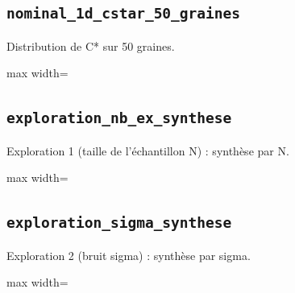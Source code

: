 \documentclass[a4paper,10pt]{article}
\newcommand{\tablesroot}{results/tables}
\begin{document}
\noindent\begin{minipage}{\linewidth}
\subsection*{\texttt{nominal\_1d\_cstar\_50\_graines}}
Distribution de C* sur 50 graines.
\par
\begingroup\centering\footnotesize
\begin{adjustbox}{max width=\linewidth}

\end{adjustbox}\par
\endgroup
\end{minipage}
\par\medskip

\noindent\begin{minipage}{\linewidth}
\subsection*{\texttt{exploration\_nb\_ex\_synthese}}
Exploration 1 (taille de l'\'echantillon N) : synth\`ese par N.
\par
\begingroup\centering\footnotesize
\begin{adjustbox}{max width=\linewidth}

\end{adjustbox}\par
\endgroup
\end{minipage}
\par\medskip

\noindent\begin{minipage}{\linewidth}
\subsection*{\texttt{exploration\_sigma\_synthese}}
Exploration 2 (bruit sigma) : synth\`ese par sigma.
\par
\begingroup\centering\footnotesize
\begin{adjustbox}{max width=\linewidth}

\end{adjustbox}\par
\endgroup
\end{minipage}
\par\medskip
\end{document}
